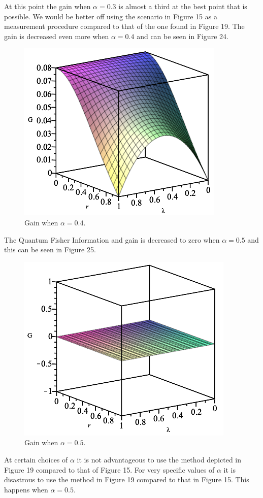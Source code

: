 \documentclass[twocolumn]{article}
\begin{document}
\newline
At this point the gain when $\alpha=0.3$ is almost a third at the best point that is possible. We would be better off using the scenario in Figure 15 as a measurement procedure compared to that of the one found in Figure 19. The gain is decreased even more when $\alpha=0.4$ and can be seen in Figure 24.
\newpage
\begin{figure}[h]
\begin{center}
\includegraphics[width=0.65\linewidth]{Phase-Flip-Two-Channel-Alpha=04-Gain.png}
\caption{Gain when $\alpha=0.4$.}
\end{center}
\end{figure}
The Quantum Fisher Information and gain is decreased to zero when $\alpha=0.5$ and this can be seen in Figure 25.
\begin{figure}[h]
\begin{center}
\includegraphics[width=0.65\linewidth]{Phase-Flip-Two-Channel-Alpha=05-Gain.png}
\caption{Gain when $\alpha=0.5$.}
\end{center}
\end{figure}
\newline
At certain choices of $\alpha$ it is not advantageous to use the method depicted in Figure 19 compared to that of Figure 15. For very specific values of $\alpha$ it is disastrous to use the method in Figure 19 compared to that in Figure 15. This happens when $\alpha=0.5$. 
\end{document}
